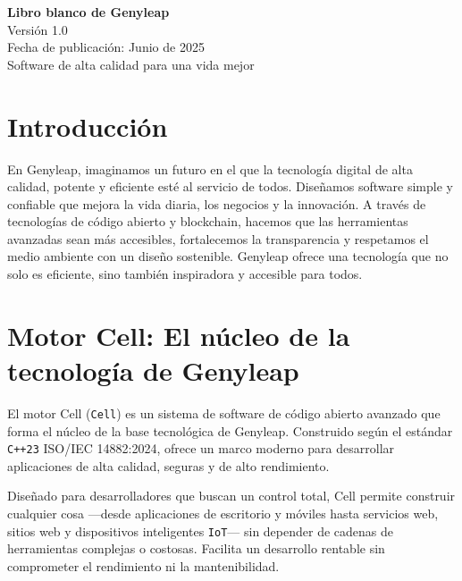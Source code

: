 \documentclass[a4paper,12pt,openany]{book}
\begin{document}
\begin{titlepage}
    \begin{center}
        \vspace*{1.5cm}
        {\Huge \textbf{Libro blanco de Genyleap}} \\
        \vspace{0.5cm}
        {\Large Versión 1.0} \\
        \vspace{0.5cm}
        {\large Fecha de publicación: Junio de 2025} \\
        \vspace{1.5cm}
        {\large Software de alta calidad para una vida mejor} \\
    \end{center}
    \vfill
\end{titlepage}

\chapter{Introducción}
En Genyleap, imaginamos un futuro en el que la tecnología digital de alta calidad, potente y eficiente esté al servicio de todos. Diseñamos software simple y confiable que mejora la vida diaria, los negocios y la innovación. A través de tecnologías de código abierto y blockchain, hacemos que las herramientas avanzadas sean más accesibles, fortalecemos la transparencia y respetamos el medio ambiente con un diseño sostenible. Genyleap ofrece una tecnología que no solo es eficiente, sino también inspiradora y accesible para todos.

\chapter{Motor Cell: El núcleo de la tecnología de Genyleap}

El motor Cell (\texttt{Cell}) es un sistema de software de código abierto avanzado que forma el núcleo de la base tecnológica de Genyleap. Construido según el estándar \texttt{C++23} ISO/IEC 14882:2024, ofrece un marco moderno para desarrollar aplicaciones de alta calidad, seguras y de alto rendimiento.

Diseñado para desarrolladores que buscan un control total, Cell permite construir cualquier cosa —desde aplicaciones de escritorio y móviles hasta servicios web, sitios web y dispositivos inteligentes \texttt{IoT}— sin depender de cadenas de herramientas complejas o costosas. Facilita un desarrollo rentable sin comprometer el rendimiento ni la mantenibilidad.
\end{document}

